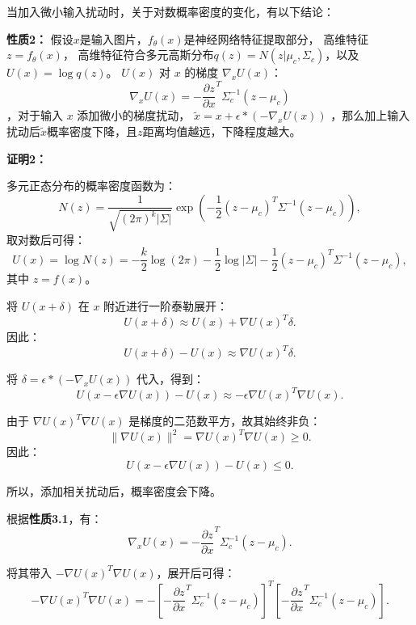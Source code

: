 

当加入微小输入扰动时，关于对数概率密度的变化，有以下结论：

\textbf{性质2：}
假设$x$是输入图片，$f_\theta(x)$是神经网络特征提取部分， 高维特征\( z = f_\theta(x) \)， 高维特征符合多元高斯分布\( q(z) =  N(z|\mu_c, \Sigma_c) \)，以及 \( U(x) = \log q(z) \)。 \( U(x) \) 对 \( x \) 的梯度 \( \nabla_x U(x) \)：\[
\nabla_x U(x) = - \frac{\partial z}{\partial x}^T \Sigma_c^{-1} \left( z - \mu_c \right)
\]，对于输入 \( x \) 添加微小的梯度扰动， $\tilde{x}=x+\epsilon* (-\nabla_x U(x))$
，那么加上输入扰动后$\tilde{x}$概率密度下降，且$z$距离均值越远，下降程度越大。

\textbf{证明2：}

多元正态分布的概率密度函数为：
\[
N(z) = \frac{1}{\sqrt{(2\pi)^k |\Sigma|}} \exp\left(-\frac{1}{2}(z - \mu_c)^T \Sigma^{-1} (z - \mu_c)\right),
\]
取对数后可得：
\[
U(x) = \log N(z) = -\frac{k}{2} \log(2\pi) - \frac{1}{2} \log |\Sigma| - \frac{1}{2} (z - \mu_c)^T \Sigma^{-1} (z - \mu_c),
\]
其中 \( z = f(x) \)。

将 \( U(x+\delta) \) 在 \( x \) 附近进行一阶泰勒展开：
\[
U(x+\delta) \approx U(x) + \nabla U(x)^T \delta.
\]
因此：
\[
U(x+\delta) - U(x) \approx \nabla U(x)^T \delta.
\]

将 \( \delta = \epsilon* (-\nabla_x U(x)) \) 代入，得到：
\[
U(x-\epsilon \nabla U(x)) - U(x) \approx - \epsilon \nabla U(x)^T \nabla U(x).
\]

由于 \( \nabla U(x)^T \nabla U(x) \) 是梯度的二范数平方，故其始终非负：
\[
\|\nabla U(x)\|^2 = \nabla U(x)^T \nabla U(x) \geq 0.
\]
因此：
\[
U(x-\epsilon \nabla U(x)) - U(x) \leq 0.
\]

所以，添加相关扰动后，概率密度会下降。

根据\textbf{性质3.1}，有：
\[
\nabla_x U(x) = - \frac{\partial z}{\partial x}^T \Sigma_c^{-1} \left( z - \mu_c \right).
\]

将其带入 \( -\nabla U(x)^T \nabla U(x) \)，展开后可得：
\[
-\nabla U(x)^T \nabla U(x) = -\left[ -\frac{\partial z}{\partial x}^T \Sigma_c^{-1} \left( z - \mu_c \right) \right]^T \left[ -\frac{\partial z}{\partial x}^T \Sigma_c^{-1} \left( z - \mu_c \right) \right].
\]

